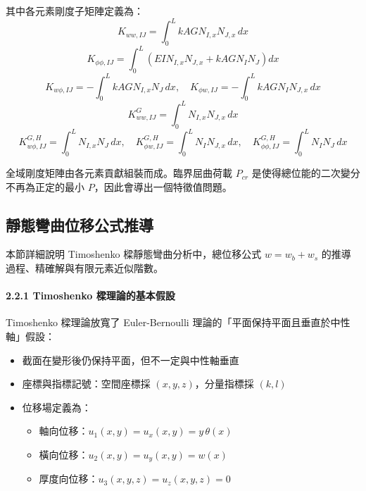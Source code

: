 ﻿\documentclass[UTF8, a4paper, 12pt]{ctexart}
\begin{document}
其中各元素剛度子矩陣定義為：
\begin{equation}
  K_{ww,IJ} = \int_{0}^{L}kAGN_{I,x}N_{J,x}\,dx
\end{equation}
\begin{equation}
  K_{\phi\phi,IJ} = \int_{0}^{L}(EIN_{I,x}N_{J,x} + kAGN_{I}N_{J})dx
\end{equation}
\begin{equation}
  K_{w\phi,IJ} = -\int_{0}^{L}kAGN_{I,x}N_{J}\,dx,\quad
  K_{\phi w,IJ} = -\int_{0}^{L}kAGN_{I}N_{J,x}\,dx
\end{equation}
\begin{equation}
  K_{ww,IJ}^{G} = \int_{0}^{L}N_{I,x}N_{J,x}\,dx
\end{equation}
\begin{equation}
  K_{w\phi,IJ}^{G,H} = \int_{0}^{L}N_{I,x}N_{J}\,dx,\quad
  K_{\phi w,IJ}^{G,H} = \int_{0}^{L}N_{I}N_{J,x}\,dx,\quad
  K_{\phi\phi,IJ}^{G,H} = \int_{0}^{L}N_{I}N_{J}\,dx
\end{equation}

全域剛度矩陣由各元素貢獻組裝而成。臨界屈曲荷載 $P_{cr}$ 是使得總位能的二次變分不再為正定的最小 $P$，因此會導出一個特徵值問題。

\subsection{靜態彎曲位移公式推導}

本節詳細說明 Timoshenko 樑靜態彎曲分析中，總位移公式 $w = w_b + w_s$ 的推導過程、精確解與有限元素近似階數。

\paragraph{2.2.1 Timoshenko 樑理論的基本假設}

Timoshenko 樑理論放寬了 Euler-Bernoulli 理論的「平面保持平面且垂直於中性軸」假設：

\begin{itemize}
  \item 截面在變形後仍保持平面，但不一定與中性軸垂直
  \item 座標與指標記號：空間座標採 $(x,y,z)$，分量指標採 $(k,l)$
  \item 位移場定義為：
  \begin{itemize}
    \item 軸向位移：$u_1(x,y)=u_x(x,y)=y\,\theta(x)$
    \item 橫向位移：$u_2(x,y)=u_y(x,y)=w(x)$
    \item 厚度向位移：$u_3(x,y,z)=u_z(x,y,z)=0$
  \end{itemize}
\end{itemize}
\end{document}
